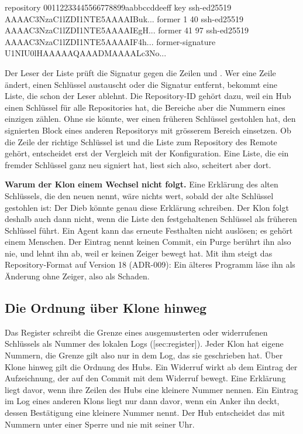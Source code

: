 \starttyping
repository 00112233445566778899aabbccddeeff
key ssh-ed25519 AAAAC3NzaC1lZDI1NTE5AAAAIBuk...
former 1 40 ssh-ed25519 AAAAC3NzaC1lZDI1NTE5AAAAIEgH...
former 41 97 ssh-ed25519 AAAAC3NzaC1lZDI1NTE5AAAAIF4h...
former-signature U1NIU0lHAAAAAQAAADMAAAALc3No...
\stoptyping

Der Leser der Liste prüft die Signatur gegen die Zeilen  und .
Wer eine Zeile  ändert, einen Schlüssel austauscht oder die Signatur entfernt,
bekommt eine Liste, die schon der Leser ablehnt.
Die Repository-ID gehört dazu, weil ein Hub einen Schlüssel für alle Repositories hat, die
Bereiche aber die Nummern eines einzigen zählen.
Ohne sie könnte, wer einen früheren Schlüssel gestohlen hat, den signierten Block eines anderen
Repositorys mit grösserem Bereich einsetzen.
Ob die Zeile  der richtige Schlüssel ist und die Liste zum Repository des Remote
gehört, entscheidet erst der Vergleich mit der Konfiguration.
Eine Liste, die ein fremder Schlüssel ganz neu signiert hat, liest sich also, scheitert aber dort.

\startinfobox
{\bf Warum der Klon einem Wechsel nicht folgt.}
Eine Erklärung des alten Schlüssels, die den neuen nennt, wäre nichts wert, sobald der alte
Schlüssel gestohlen ist: Der Dieb könnte genau diese Erklärung schreiben.
Der Klon folgt deshalb auch dann nicht, wenn die Liste den festgehaltenen Schlüssel als früheren
Schlüssel führt.
Ein Agent kann das erneute Festhalten nicht auslösen; es gehört einem Menschen.
Der Eintrag  nennt keinen Commit, ein Purge berührt ihn also nie, und
 lehnt ihn ab, weil er keinen Zeiger bewegt hat.
Mit ihm steigt das Repository-Format auf Version 18 (ADR-009): Ein älteres Programm läse ihn als
Änderung ohne Zeiger, also als Schaden.
\stopinfobox

\subsection{Die Ordnung über Klone hinweg}

Das Register schreibt die Grenze eines ausgemusterten oder widerrufenen Schlüssels als Nummer des
lokalen Logs ([sec:register]).
Jeder Klon hat eigene Nummern, die Grenze gilt also nur in dem Log, das sie geschrieben hat.
Über Klone hinweg gilt die Ordnung des Hubs.
Ein Widerruf wirkt ab dem Eintrag der Aufzeichnung, der  auf den Commit mit dem
Widerruf bewegt.
Eine Erklärung liegt davor, wenn ihre Zeilen des Hubs eine kleinere Nummer nennen.
Ein Eintrag im Log eines anderen Klons liegt nur dann davor, wenn ein Anker ihn deckt, dessen
Bestätigung eine kleinere Nummer nennt.
Der Hub entscheidet das mit Nummern unter einer Sperre und nie mit seiner Uhr.

